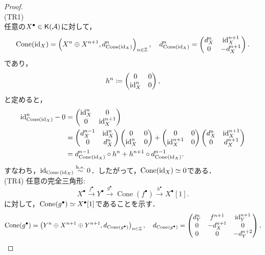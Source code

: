 \begin{proof}\hfill\\
	(TR1)\\
	任意の$X^\bullet\in \mathsf{K}({\mathcal A})$に対して，
	\[\operatorname{\mathrm{Cone}}(\mathrm{id}_X) = \left(X^n\oplus X^{n+1},d^n_{\operatorname{\mathrm{Cone}}(\mathrm{id}_X)}\right)_{n\in{\mathbb Z}},\quad
 d^n_{\operatorname{\mathrm{Cone}}(\mathrm{id}_X)} = 
		\begin{pmatrix}
		d^{n}_X & \mathrm{id}^{n+1}_{X}\\
		0 & -d^{n+1}_{X}\\
\end{pmatrix}.\]
であり，
\[h^n \coloneq \begin{pmatrix}0&0\\ \mathrm{id}^n_X &0\end{pmatrix},\]
と定めると，
\begin{align*}
	\mathrm{id}^n_{\operatorname{\mathrm{Cone}}(\mathrm{id}_X)} - 0 &= \begin{pmatrix}\mathrm{id}^{n}_X&0 \\ 0 &\mathrm{id}^{n+1}_X\end{pmatrix}\\
													 & = \begin{pmatrix}d^{n-1}_X&\mathrm{id}^n_X\\0 & d^n_X\end{pmatrix}\begin{pmatrix}0&0\\ \mathrm{id}^n_{X} & 0\end{pmatrix} +\begin{pmatrix}0&0\\ \mathrm{id}^{n+1}_{X} & 0\end{pmatrix} \begin{pmatrix}d^{n}_X&\mathrm{id}^{n+1}_X\\0 & d^{n+1}_X\end{pmatrix}\\
													 &= d^{n-1}_{\operatorname{\mathrm{Cone}}(\mathrm{id}_X)}\circ h^n + h^{n+1}\circ d^{n-1}_{\operatorname{\mathrm{Cone}}(\mathrm{id}_X)}.
\end{align*}
すなわち，$\mathrm{id}_{\operatorname{\mathrm{Cone}}{(\mathrm{id}_X)}}\overset{\mathrm{h.e.}}{\sim}0$．したがって，$\operatorname{\mathrm{Cone}}(\mathrm{id}_X)\simeq 0$である．\\
(TR4) 任意の完全三角形:
  \[
		X^\bullet \xrightarrow{f^\bullet} Y^\bullet \xrightarrow{g^\bullet} \operatorname{Cone}(f^\bullet) \xrightarrow{h^\bullet} X^\bullet[1].
  \]
	に対して，$\operatorname{\mathrm{Cone}}(g^\bullet)\simeq X^\bullet[1]$であることを示す．
\[\operatorname{\mathrm{Cone}}(g^\bullet) = \left(Y^n\oplus X^{n+1}\oplus Y^{n+1},d_{\operatorname{\mathrm{Cone}}(g^\bullet)}\right)_{n\in{\mathbb Z}},\quad
	d_{\operatorname{\mathrm{Cone}}({g^\bullet})} = 
	\begin{pmatrix}
		d^n_Y & f^{n+1} & \mathrm{id}^{n+1}_{Y}\\
		0 & -d^{n+1}_X & 0\\
		0 & 0 &-d^{n+2}_Y
	\end{pmatrix},\]


\end{proof}
